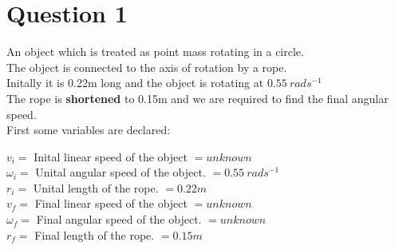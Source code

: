 \documentclass[12pt]{article}
\begin{document}
\section{Question 1}
An object which is treated as point mass rotating in a circle. \\
The object is connected to the axis of rotation by a rope. \\
Initally it is 0.22m long and the object is rotating at $0.55 \ rads^{-1}$ \\
The rope is \textbf{shortened} to 0.15m and we are required to find the final angular speed.\\

First some variables are declared: \\ 
\begin{list*}
$v_i =$ Inital linear speed of the object $=unknown$ \\
$\omega_i =$  Unital angular speed of the object. $= 0.55 \ rads^{-1} $ \\
$r_i =$ Unital length of the rope. $= 0.22m $ \\
$v_f =$ Final linear speed of the object $= unknown$ \\
$\omega_f =$  Final angular speed of the object. $ = unknown$\\
$r_f =$ Final length of the rope. $ = 0.15m$
\end{list*}
\end{document}
